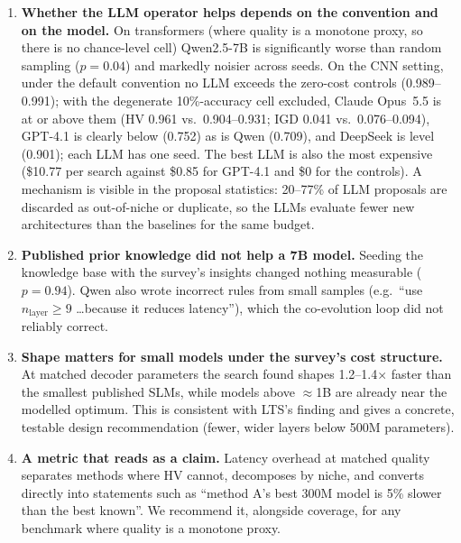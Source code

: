 \documentclass[11pt,a4paper]{article}
\begin{document}
\begin{enumerate}
  \item \textbf{Whether the LLM operator helps depends on the convention and on the model.} On transformers (where quality is a monotone proxy, so there is no chance-level cell) Qwen2.5-7B is significantly worse than random sampling ($p=0.04$) and markedly noisier across seeds. On the CNN setting, under the default convention no LLM exceeds the zero-cost controls (0.989--0.991); with the degenerate 10\%-accuracy cell excluded, Claude Opus~5.5 is at or above them (HV 0.961 vs.\ 0.904--0.931; IGD 0.041 vs.\ 0.076--0.094), GPT-4.1 is clearly below (0.752) as is Qwen (0.709), and DeepSeek is level (0.901); each LLM has one seed. The best LLM is also the most expensive (\$10.77 per search against \$0.85 for GPT-4.1 and \$0 for the controls). A mechanism is visible in the proposal statistics: 20--77\% of LLM proposals are discarded as out-of-niche or duplicate, so the LLMs evaluate fewer new architectures than the baselines for the same budget.
  \item \textbf{Published prior knowledge did not help a 7B model.} Seeding the knowledge base with the survey's insights changed nothing measurable ($p=0.94$). Qwen also wrote incorrect rules from small samples (e.g.\ ``use $n_{\text{layer}}\ge9$ \ldots because it reduces latency''), which the co-evolution loop did not reliably correct.
  \item \textbf{Shape matters for small models under the survey's cost structure.} At matched decoder parameters the search found shapes 1.2--1.4$\times$ faster than the smallest published SLMs, while models above $\approx$1B are already near the modelled optimum. This is consistent with LTS's finding and gives a concrete, testable design recommendation (fewer, wider layers below 500M parameters).
  \item \textbf{A metric that reads as a claim.} Latency overhead at matched quality separates methods where HV cannot, decomposes by niche, and converts directly into statements such as ``method A's best 300M model is 5\% slower than the best known''. We recommend it, alongside coverage, for any benchmark where quality is a monotone proxy.

\end{enumerate}
\end{document}
